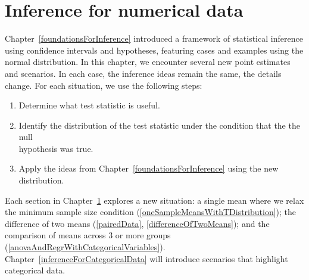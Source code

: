 \chapter{Inference for numerical data}
\label{inferenceForNumericalData}

Chapter~\ref{foundationsForInference} introduced a framework of statistical inference using confidence intervals and hypotheses, featuring cases and examples using the normal distribution. %
In this chapter, we encounter several new point estimates and scenarios. In each case, the inference ideas remain the same, the details change. For each situation, we use the following steps:
\begin{enumerate}
\setlength{\itemsep}{0mm}
\item Determine what test statistic is useful.
\item Identify the distribution of the test statistic under the condition that the the null\\hypothesis was true.
\item Apply the ideas from Chapter~\ref{foundationsForInference} using the new distribution.
\end{enumerate}
Each section in Chapter~\ref{inferenceForNumericalData} explores a new situation: a single mean where we relax the minimum sample size condition (\ref{oneSampleMeansWithTDistribution}); the difference of two means (\ref{pairedData}, \ref{differenceOfTwoMeans}); and the comparison of means across 3 or more groups (\ref{anovaAndRegrWithCategoricalVariables}). Chapter~\ref{inferenceForCategoricalData} will introduce scenarios that highlight categorical data.


